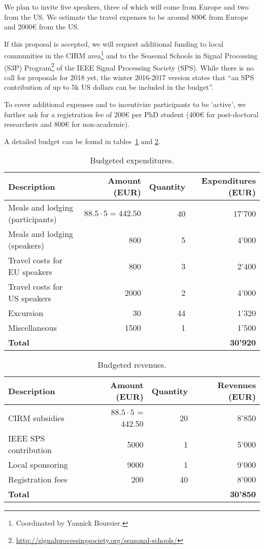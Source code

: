 \documentclass[a4paper]{scrartcl}
\begin{document}
We plan to invite five speakers, three of which will come from Europe and two
from the US. We estimate the travel expenses to be around 800€ from Europe and
2000€ from the US.

If this proposal is accepted, we will request additional funding to local
communities in the CIRM area\footnote{Coordinated by Yannick Boursier.} and to
the Seasonal Schools in Signal Processing (S3P)
Program\footnote{\url{http://signalprocessingsociety.org/seasonal-schools/}} of
the IEEE Signal Processing Society (SPS). While there is no call for proposals
for 2018 yet, the winter 2016-2017 version states that ``an SPS contribution of
up to 5k US dollars can be included in the budget''.

To cover additional expenses and to incentivize participants to be 'active', we
further ask for a registration fee of 200€ per PhD student (400€ for
post-doctoral researchers and 800€ for non-academic).

A detailed budget can be found in tables~\ref{tab:expenditures} and
\ref{tab:revenues}.

\begin{table}[ht]
	\centering
	\begin{tabular}{|l|r|r|r|}
	\hline
	Description & Amount (EUR) & Quantity & Expenditures (EUR) \\
	\hline
	Meals and lodging (participants) & $88.5\cdot5=442.50$ & 40 & 17'700 \\
	Meals and lodging (speakers) & 800 & 5 & 4'000 \\
	Travel costs for EU speakers & 800  & 3 & 2'400 \\
	Travel costs for US speakers & 2000 & 2 & 4'000 \\
	Excursion & 30 & 44 & 1'320 \\
	Miscellaneous & 1500 & 1 & 1'500 \\
	\hline
	\multicolumn{3}{|l|}{\textbf{Total}} & \textbf{30'920} \\
	\hline
	\end{tabular}
	\caption{Budgeted expenditures.}
	\label{tab:expenditures}
\end{table}

\begin{table}[ht]
	\centering
	\begin{tabular}{|l|r|r|r|}
	\hline
	Description & Amount (EUR) & Quantity & Revenues (EUR) \\
	\hline
	CIRM subsidies & $88.5 \cdot 5$ = 442.50 & 20 & 8'850 \\
	IEEE SPS contribution & 5000 & 1 & 5'000 \\
	Local sponsoring & 9000  & 1 & 9'000 \\
	Registration fees & 200 & 40 & 8'000 \\
	\hline
	\multicolumn{3}{|l|}{\textbf{Total}} & \textbf{30'850} \\
	\hline
	\end{tabular}
	\caption{Budgeted revenues.}
	\label{tab:revenues}
\end{table}

\printbibliography
\end{document}

